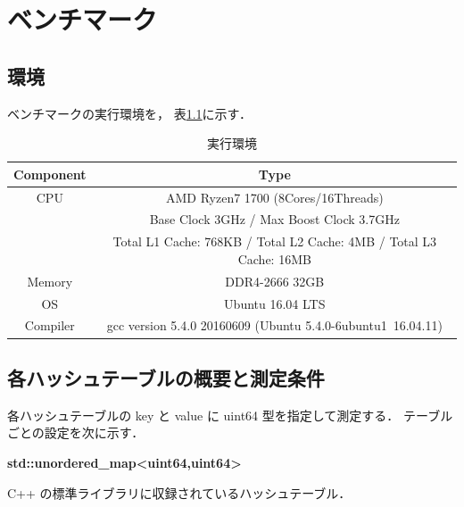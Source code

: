 \chapter{ベンチマーク}
\label{chap_Results}

\section{環境}

ベンチマークの実行環境を，
表\ref{table_env}に示す．

\begin{table}[hbtp]
  \label{table_env}
  \begin{center}
    \caption{実行環境}
    \begin{tabular}{cc} \hline
      Component & Type \rule[0pt]{0pt}{0pt} \\ \hline
      CPU & AMD Ryzen7 1700 (8Cores/16Threads) \rule[0pt]{0pt}{0pt} \\ 
      & Base Clock 3GHz / Max Boost Clock 3.7GHz \rule[0pt]{0pt}{0pt} \\
      & Total L1 Cache: 768KB / Total L2 Cache: 4MB / Total L3 Cache: 16MB \\
      Memory & DDR4-2666 32GB \rule[0pt]{0pt}{0pt} \\
      OS & Ubuntu 16.04 LTS \rule[0pt]{0pt}{0pt} \\
      Compiler & gcc version 5.4.0 20160609 (Ubuntu 5.4.0-6ubuntu1~16.04.11) \rule[0pt]{0pt}{0pt} \\ \hline
    \end{tabular}
  \end{center}
\end{table}


\section{各ハッシュテーブルの概要と測定条件}
各ハッシュテーブルの key と value に uint64 型を指定して測定する．
テーブルごとの設定を次に示す．
\leavevmode \newline

%
{\bf std::unordered\_map<uint64,uint64>}

C++ の標準ライブラリに収録されているハッシュテーブル．
\leavevmode \newline

